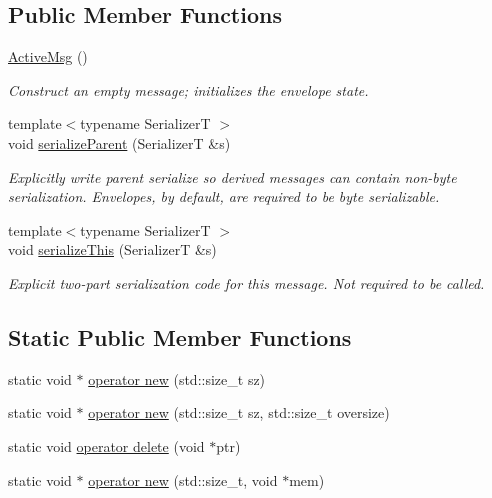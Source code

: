 \subsection*{Public Member Functions}
\begin{DoxyCompactItemize}
\item 
\hyperlink{structvt_1_1messaging_1_1_active_msg_a5fd6a7b78c86b8f1e36198142990a4c4}{Active\+Msg} ()
\begin{DoxyCompactList}\small\item\em Construct an empty message; initializes the envelope state. \end{DoxyCompactList}\item 
{\footnotesize template$<$typename SerializerT $>$ }\\void \hyperlink{structvt_1_1messaging_1_1_active_msg_af2e3461bf33d85487cdadc5d20f6ecf8}{serialize\+Parent} (SerializerT \&s)
\begin{DoxyCompactList}\small\item\em Explicitly write parent serialize so derived messages can contain non-\/byte serialization. Envelopes, by default, are required to be byte serializable. \end{DoxyCompactList}\item 
{\footnotesize template$<$typename SerializerT $>$ }\\void \hyperlink{structvt_1_1messaging_1_1_active_msg_abd53a03d9c35dde3eadebbd8557a78e0}{serialize\+This} (SerializerT \&s)
\begin{DoxyCompactList}\small\item\em Explicit two-\/part serialization code for this message. Not required to be called. \end{DoxyCompactList}\end{DoxyCompactItemize}
\subsection*{Static Public Member Functions}
\begin{DoxyCompactItemize}
\item 
static void $\ast$ \hyperlink{structvt_1_1messaging_1_1_active_msg_ac79d16742251f19ed94f9725ed866f64}{operator new} (std\+::size\+\_\+t sz)
\item 
static void $\ast$ \hyperlink{structvt_1_1messaging_1_1_active_msg_ac13140f75e5238670c81589a84881ac1}{operator new} (std\+::size\+\_\+t sz, std\+::size\+\_\+t oversize)
\item 
static void \hyperlink{structvt_1_1messaging_1_1_active_msg_a37cd0731f99157266333772f501d390d}{operator delete} (void $\ast$ptr)
\item 
static void $\ast$ \hyperlink{structvt_1_1messaging_1_1_active_msg_a03927a2881ef7e3308765361cb89c606}{operator new} (std\+::size\+\_\+t, void $\ast$mem)
\end{DoxyCompactItemize}
